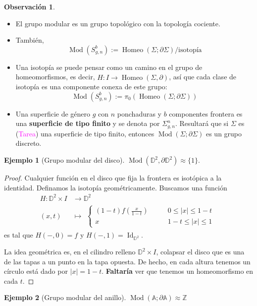 \documentclass[spanish]{article}
\theoremstyle{definition}
\newtheorem*{obs}{Observación}
\newtheorem*{ejem}{Ejemplo}
\newcommand{\Z}{\mathbb{Z}}
\newcommand{\A}{\mathbb{A}}
\newcommand{\D}{\mathbb{D}}
\DeclareMathOperator{\Id}{Id}
\DeclareMathOperator{\Mod}{Mod}
\DeclareMathOperator{\Homeo}{Homeo}
\begin{document}
	\begin{obs}\leavevmode
	\begin{itemize}
		\item 	El grupo modular es un grupo topológico con la topología cociente.
		\item También,
			\[\Mod(S_{g,n}^b):=\Homeo(\Sigma;\partial \Sigma)\Big/\text{isotopía}\]
		\item Una isotopía se puede pensar como un camino en el grupo de homeomorfismos, es decir, $\hat{H}:I\to\Homeo(\Sigma,\partial)$, así que cada clase de isotopía es una componente conexa de este grupo:
			\[\Mod(S_{g,n}^b):=\pi_0(\Homeo(\Sigma;\partial \Sigma))\]
		\item Una superficie de género $g$ con $n$ ponchaduras y $b$ componentes frontera es una \textbf{superficie de tipo finito} y se denota por $\Sigma^n_{g,n}$. Resultará que si $\Sigma$ es (\textcolor{magenta}{Tarea}) una superficie de tipo finito, entonces $\Mod(\Sigma;\partial\Sigma)$ es un grupo discreto.
	\end{itemize}
	\end{obs}
	\begin{ejem}[Grupo modular del disco]
		$\Mod(\D^2,\partial\D^2)\approx\{1\}$.
	\end{ejem}
	\begin{proof}
		Cualquier función en el disco que fija la frontera es isotópica a la identidad. Definamos la isotopía geométricamente. Buscamos una función
		\begin{align*}
			H:\D^2\times I&\to\D^2\\
			(x,t)&\mapsto
			\begin{aligned}
				\begin{cases}
				(1-t)f(\frac{x}{1-t})&\qquad0\leq|x|\leq1-t\\
				x&\qquad1-t\leq|x|\leq1
			\end{cases}
			\end{aligned}
		\end{align*}
		es tal que $H(-,0)=f$ y $H(-,1)=\Id_{\D^2}$.
		
		La idea geométrica es, en el cilindro relleno $\D^2\times I$, colapsar el disco que es una de las tapas a un punto en la tapa opuesta. De hecho, en cada altura tenemos un círculo está dado por $|x|=1-t$. \textbf{Faltaría} ver que tenemos un homeomorfismo en cada $t$.
	\end{proof}
	\begin{ejem}[Grupo modular del anillo]
		$\Mod(\A;\partial\A)\approx\Z$
	\end{ejem}
\end{document}
